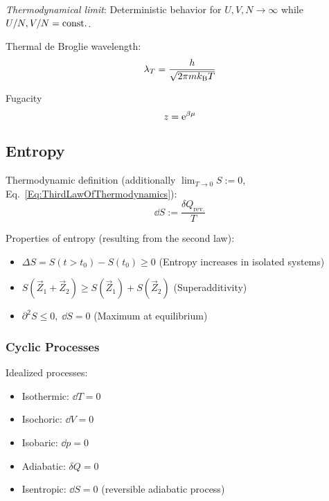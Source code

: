 		\emph{Thermodynamical limit}: \newline Deterministic behavior for $U,V,N \to \infty$ while $U/N,V/N=\mathrm{const.}$. \vsp

		\noindent
		Thermal de Broglie wavelength:
		\begin{equation}
			\label{Eq:ThermalDeBroglieWavelength}
			\lambda_T = \frac{h}{\sqrt{2\pi m k_{\text{B}} T}}
		\end{equation} \vsp

		\noindent
		Fugacity
		\begin{equation}
			z = \mathrm{e}^{\beta\mu}
		\end{equation} \vsp

	\subsection{Entropy}
		\noindent
		Thermodynamic definition (additionally $\lim_{T \to 0} S := 0$, Eq.~\ref{Eq:ThirdLawOfThermodynamics}):
		\begin{equation}
			\dd S := \frac{\delta Q_\text{rev.}}{T}
		\end{equation}

		\noindent
		Properties of entropy (resulting from the second law):
		\begin{itemize}\itemsep -0pt	%
			\item $\Delta S = S(t>t_0)-S(t_0) \ge 0$ \hfill{(Entropy increases in isolated systems)}
			\item $S(\vec{Z}_1 + \vec{Z}_2) \ge S(\vec{Z}_1) + S(\vec{Z}_2)$ \hfill{(Superadditivity)}
			\item $\partial^2 S \le 0,\;\dd S = 0$ \hfill{(Maximum at equilibrium)}
		\end{itemize}

		\subsubsection{Cyclic Processes}
			\noindent
			Idealized processes:
			\begin{itemize}
				\item Isothermic: $\dd T = 0$
				\item Isochoric: $\dd V = 0$
				\item Isobaric: $\dd p = 0$
				\item Adiabatic: $\delta Q = 0$
				\item Isentropic: $\dd S = 0$ (reversible adiabatic process)
			\end{itemize}


